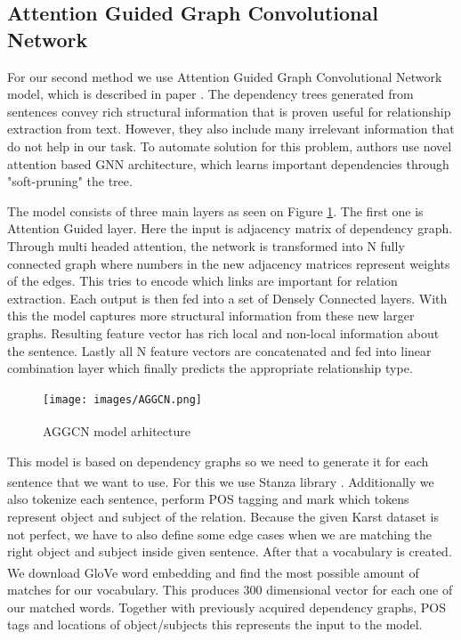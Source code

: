 \documentclass[fleqn,moreauthors,10pt]{ds_report}
\begin{document}
\subsection{Attention Guided Graph Convolutional Network}
\par For our second method we use Attention Guided Graph Convolutional Network model, which is described in paper \cite{zhijiang_nodate}. The dependency trees generated from sentences convey rich structural information that is proven useful for relationship extraction from text. However, they also include many irrelevant information that do not help in our task. To automate solution for this problem, authors use novel attention based GNN architecture, which learns important dependencies through "soft-pruning" the tree. 
\par The model consists of three main layers as seen on Figure \ref{fig:aggcn}. The first one is Attention Guided layer. Here the input is adjacency matrix of dependency graph. Through multi headed attention, the network is transformed into N fully connected graph where numbers in the new adjacency matrices represent weights of the edges. This tries to encode which links are important for relation extraction. Each output is then fed into a set of Densely Connected layers. With this the model captures more structural information from these new larger graphs. Resulting feature vector has rich local and non-local information about the sentence. Lastly all N feature vectors are concatenated and fed into linear combination layer which finally predicts the appropriate relationship type.

\begin{figure}[h]
    \centering
    \texttt{[image: images/AGGCN.png]}
    \caption{AGGCN model arhitecture \textsuperscript{\cite{zhijiang_nodate}}}
    \label{fig:aggcn}
\end{figure}

\newpage
\par This model is based on dependency graphs so we need to generate it for each sentence that we want to use. For this we use Stanza library \textsuperscript{\cite{qi2020stanza}}. Additionally we also tokenize each sentence, perform POS tagging and mark which tokens represent object and subject of the relation. Because the given Karst dataset is not perfect, we have to also define some edge cases when we are matching the right object and subject inside given sentence. After that a vocabulary is created. We download GloVe word embedding\textsuperscript{\cite{pennington2014glove}} and find the most possible amount of matches for our vocabulary. This produces 300 dimensional vector for each one of our matched words. Together with previously acquired dependency graphs, POS tags and locations of object/subjects this represents the input to the model. 
\end{document}

